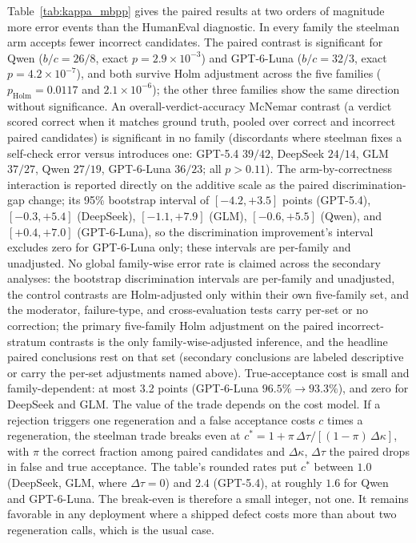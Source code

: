 \documentclass[a4paper,journal]{IAENGtran}
\begin{document}
Table~\ref{tab:kappa_mbpp} gives the paired results at two orders of magnitude more
error events than the HumanEval diagnostic. In every family the steelman arm accepts
fewer incorrect candidates. The paired contrast is significant for Qwen ($b/c=26/8$,
exact $p=2.9\times10^{-3}$) and GPT-6-Luna ($b/c=32/3$, exact $p=4.2\times10^{-7}$),
and both survive Holm adjustment across the five families ($p_{\mathrm{Holm}}=0.0117$
and $2.1\times10^{-6}$); the other three families show the same direction without
significance. An overall-verdict-accuracy McNemar contrast (a verdict scored correct when it
matches ground truth, pooled over correct and incorrect paired candidates) is
significant in no family (discordants where steelman fixes a self-check error versus
introduces one: GPT-5.4 $39/42$, DeepSeek $24/14$, GLM $37/27$, Qwen $27/19$,
GPT-6-Luna $36/23$; all $p>0.11$). The arm-by-correctness interaction is reported
directly on the additive scale as the paired discrimination-gap change; its
95\% bootstrap interval of $[-4.2,+3.5]$ points (GPT-5.4), $[-0.3,+5.4]$ (DeepSeek),
$[-1.1,+7.9]$ (GLM), $[-0.6,+5.5]$ (Qwen), and $[+0.4,+7.0]$ (GPT-6-Luna), so the
discrimination improvement's interval excludes zero for GPT-6-Luna only; these intervals are
per-family and unadjusted. No global family-wise error rate is claimed across the
secondary analyses: the bootstrap discrimination intervals are per-family and
unadjusted, the control contrasts are Holm-adjusted only within their own
five-family set, and the moderator, failure-type, and cross-evaluation tests carry
per-set or no correction; the primary five-family Holm adjustment on the paired
incorrect-stratum contrasts is the only family-wise-adjusted inference, and the
headline paired conclusions rest on that set (secondary conclusions are labeled
descriptive or carry the per-set adjustments named above). True-acceptance cost is small and family-dependent: at most
3.2 points (GPT-6-Luna $96.5\%\rightarrow93.3\%$), and zero for DeepSeek and GLM.
The value of the trade depends on the cost model. If a rejection triggers one
regeneration and a false acceptance costs $c$ times a regeneration, the steelman
trade breaks even at
$c^{*}=1+\pi\,\Delta\tau\big/[(1-\pi)\,\Delta\kappa]$,
with $\pi$ the correct fraction among paired candidates and $\Delta\kappa$,
$\Delta\tau$ the paired drops in false and true acceptance. The table's rounded
rates put $c^{*}$ between $1.0$ (DeepSeek, GLM, where $\Delta\tau=0$) and $2.4$
(GPT-5.4), at roughly $1.6$ for Qwen and GPT-6-Luna. The break-even is therefore
a small integer, not one. It
remains favorable in any deployment where a shipped defect costs more than about
two regeneration calls, which is the usual case.
\end{document}
